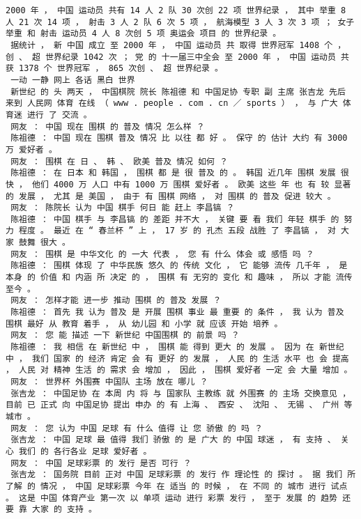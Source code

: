 \documentclass{article}
\begin{document}
\begin{Verbatim}[commandchars=\\\{\}]
 2000 年 ， 中国 运动员 共有 14 人 2 队 30 次创 22 项 世界纪录 ， 其中 举重 8 人 21 次 14 项 ， 射击 3 人 2 队 6 次 5 项 ， 航海模型 3 人 3 次 3 项 ； 女子 举重 和 射击 运动员 4 人 8 次创 5 项 奥运会 项目 的 世界纪录 。 
 据统计 ， 新 中国 成立 至 2000 年 ， 中国 运动员 共 取得 世界冠军 1408 个 ， 创 、 超 世界纪录 1042 次 ； 党 的 十一届三中全会 至 2000 年 ， 中国 运动员 共获 1378 个 世界冠军 ， 865 次创 、 超 世界纪录 。 
 一动 一静 网上 各话 黑白 世界 
 新世纪 的 头 两天 ， 中国棋院 院长 陈祖德 和 中国足协 专职 副 主席 张吉龙 先后 来到 人民网 体育 在线 （ www . people . com . cn ／ sports ） ， 与 广大 体育迷 进行 了 交流 。 
 网友 ： 中国 现在 围棋 的 普及 情况 怎么样 ？ 
 陈祖德 ： 中国 现在 围棋 普及 情况 比 以往 都 好 。 保守 的 估计 大约 有 3000 万 爱好者 。 
 网友 ： 围棋 在 日 、 韩 、 欧美 普及 情况 如何 ？ 
 陈祖德 ： 在 日本 和 韩国 ， 围棋 都 是 很 普及 的 。 韩国 近几年 围棋 发展 很快 ， 他们 4000 万 人口 中有 1000 万 围棋 爱好者 。 欧美 这些 年 也 有 较 显著 的 发展 ， 尤其 是 美国 ， 由于 有 围棋 网络 ， 对 围棋 的 普及 促进 较大 。 
 网友 ： 陈院长 认为 中国 棋手 何日 能 赶上 李昌镐 ？ 
 陈祖德 ： 中国 棋手 与 李昌镐 的 差距 并不大 ， 关键 要 看 我们 年轻 棋手 的 努力 程度 。 最近 在 “ 春兰杯 ” 上 ， 17 岁 的 孔杰 五段 战胜 了 李昌镐 ， 对 大家 鼓舞 很大 。 
 网友 ： 围棋 是 中华文化 的 一大 代表 ， 您 有 什么 体会 或 感悟 吗 ？ 
 陈祖德 ： 围棋 体现 了 中华民族 悠久 的 传统 文化 ， 它 能够 流传 几千年 ， 是 本身 的 价值 和 内涵 所 决定 的 ， 围棋 有 无穷的 变化 和 趣味 ， 所以 才能 流传 至今 。 
 网友 ： 怎样才能 进一步 推动 围棋 的 普及 发展 ？ 
 陈祖德 ： 首先 我 认为 普及 是 开展 围棋 事业 最 重要 的 条件 ， 我 认为 普及 围棋 最好 从 教育 着手 ， 从 幼儿园 和 小学 就 应该 开始 培养 。 
 网友 ： 您 能 描述 一下 新世纪 中国围棋 的 前景 吗 ？ 
 陈祖德 ： 我 相信 在 新世纪 中 ， 围棋 能 得到 更大 的 发展 。 因为 在 新世纪 中 ， 我们 国家 的 经济 肯定 会 有 更好 的 发展 ， 人民 的 生活 水平 也 会 提高 ， 人民 对 精神 生活 的 需求 会 增加 ， 因此 ， 围棋 爱好者 一定 会 大量 增加 。 
 网友 ： 世界杯 外围赛 中国队 主场 放在 哪儿 ？ 
 张吉龙 ： 中国足协 在 本周 内 将 与 国家队 主教练 就 外围赛 的 主场 交换意见 ， 目前 已 正式 向 中国足协 提出 申办 的 有 上海 、 西安 、 沈阳 、 无锡 、 广州 等 城市 。 
 网友 ： 您 认为 中国 足球 有 什么 值得 让 您 骄傲 的 吗 ？ 
 张吉龙 ： 中国 足球 最 值得 我们 骄傲 的 是 广大 的 中国 球迷 ， 有 支持 、 关心 我们 的 各行各业 足球 爱好者 。 
 网友 ： 中国 足球彩票 的 发行 是否 可行 ？ 
 张吉龙 ： 国务院 目前 正对 中国 足球彩票 的 发行 作 理论性 的 探讨 。 据 我们 所 了解 的 情况 ， 中国 足球彩票 今年 在 适当 的 时候 ， 在 不同 的 城市 进行 试点 。 这是 中国 体育产业 第一次 以 单项 运动 进行 彩票 发行 ， 至于 发展 的 趋势 还要 靠 大家 的 支持 。 

\end{Verbatim}
\end{document}
